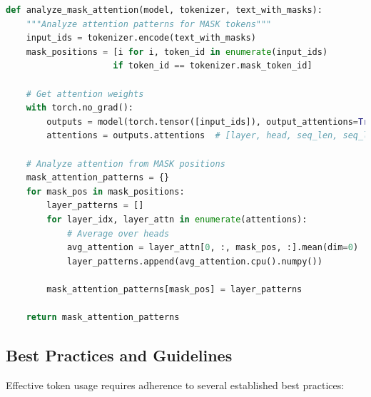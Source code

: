 \begin{lstlisting}[language=Python, caption=Mask token attention analysis]
def analyze_mask_attention(model, tokenizer, text_with_masks):
    """Analyze attention patterns for MASK tokens"""
    input_ids = tokenizer.encode(text_with_masks)
    mask_positions = [i for i, token_id in enumerate(input_ids) 
                     if token_id == tokenizer.mask_token_id]
    
    # Get attention weights
    with torch.no_grad():
        outputs = model(torch.tensor([input_ids]), output_attentions=True)
        attentions = outputs.attentions  # [layer, head, seq_len, seq_len]
    
    # Analyze attention from MASK positions
    mask_attention_patterns = {}
    for mask_pos in mask_positions:
        layer_patterns = []
        for layer_idx, layer_attn in enumerate(attentions):
            # Average over heads
            avg_attention = layer_attn[0, :, mask_pos, :].mean(dim=0)
            layer_patterns.append(avg_attention.cpu().numpy())
        
        mask_attention_patterns[mask_pos] = layer_patterns
    
    return mask_attention_patterns
\end{lstlisting}

\subsection{Best Practices and Guidelines}

Effective \mask{} token usage requires adherence to several established best practices:

